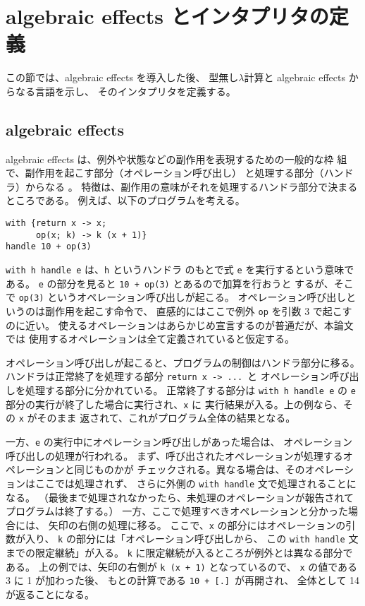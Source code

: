 \section{algebraic effects とインタプリタの定義}
\label{section:definition}

この節では、algebraic effects を導入した後、
型無し$\lambda$計算と algebraic effects からなる言語を示し、
そのインタプリタを定義する。

\subsection{algebraic effects}
\label{subsection:algebraic effects}

algebraic effects は、例外や状態などの副作用を表現するための一般的な枠
組で、副作用を起こす部分（オペレーション呼び出し）
と処理する部分（ハンドラ）からなる \cite{PRETNAR201519}。
特徴は、副作用の意味がそれを処理するハンドラ部分で決まるところである。
例えば、以下のプログラムを考える。
\begin{verbatim}
with {return x -> x;
      op(x; k) -> k (x + 1)}
handle 10 + op(3)
\end{verbatim}
\texttt{with h handle e} は、\texttt{h} というハンドラ
のもとで式 \texttt{e} を実行するという意味である。
\texttt{e} の部分を見ると \texttt{10 + op(3)} とあるので加算を行おうと
するが、そこで \texttt{op(3)} というオペレーション呼び出しが起こる。
オペレーション呼び出しというのは副作用を起こす命令で、
直感的にはここで例外 \texttt{op} を引数 3 で起こすのに近い。
使えるオペレーションはあらかじめ宣言するのが普通だが、本論文では
使用するオペレーションは全て定義されていると仮定する。

オペレーション呼び出しが起こると、プログラムの制御はハンドラ部分に移る。
ハンドラは正常終了を処理する部分 \texttt{return x -> ...}\ と
オペレーション呼び出しを処理する部分に分かれている。
正常終了する部分は
\texttt{with h handle e}
の \texttt{e} 部分の実行が終了した場合に実行され、\texttt{x} に
実行結果が入る。上の例なら、その \texttt{x} がそのまま
返されて、これがプログラム全体の結果となる。

一方、\texttt{e} の実行中にオペレーション呼び出しがあった場合は、
オペレーション呼び出しの処理が行われる。
まず、呼び出されたオペレーションが処理するオペレーションと同じものかが
チェックされる。異なる場合は、そのオペレーションはここでは処理されず、
さらに外側の \texttt{with handle} 文で処理されることになる。
（最後まで処理されなかったら、未処理のオペレーションが報告されて
プログラムは終了する。）
一方、ここで処理すべきオペレーションと分かった場合には、
矢印の右側の処理に移る。
ここで、\texttt{x} の部分にはオペレーションの引数が入り、
\texttt{k} の部分には「オペレーション呼び出しから、
この \texttt{with handle} 文までの限定継続」が入る。
\texttt{k} に限定継続が入るところが例外とは異なる部分である。
上の例では、矢印の右側が \texttt{k (x + 1)} となっているので、
\texttt{x} の値である 3 に 1 が加わった後、
もとの計算である \texttt{10 + [.]}\ が再開され、
全体として 14 が返ることになる。

